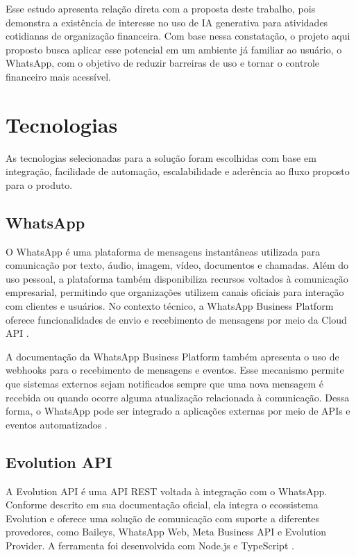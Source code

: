 Esse estudo apresenta relação direta com a proposta deste trabalho, pois demonstra a existência de interesse no uso de IA generativa para atividades cotidianas de organização financeira. Com base nessa constatação, o projeto aqui proposto busca aplicar esse potencial em um ambiente já familiar ao usuário, o WhatsApp, com o objetivo de reduzir barreiras de uso e tornar o controle financeiro mais acessível.

\section{Tecnologias}

As tecnologias selecionadas para a solução foram escolhidas com base em integração, facilidade de automação, escalabilidade e aderência ao fluxo proposto para o produto.

\subsection{WhatsApp}

O WhatsApp é uma plataforma de mensagens instantâneas utilizada para comunicação por texto, áudio, imagem, vídeo, documentos e chamadas. Além do uso pessoal, a plataforma também disponibiliza recursos voltados à comunicação empresarial, permitindo que organizações utilizem canais oficiais para interação com clientes e usuários. No contexto técnico, a WhatsApp Business Platform oferece funcionalidades de envio e recebimento de mensagens por meio da Cloud API \cite{whatsapp_cloud_api_2026}.

A documentação da WhatsApp Business Platform também apresenta o uso de webhooks para o recebimento de mensagens e eventos. Esse mecanismo permite que sistemas externos sejam notificados sempre que uma nova mensagem é recebida ou quando ocorre alguma atualização relacionada à comunicação. Dessa forma, o WhatsApp pode ser integrado a aplicações externas por meio de APIs e eventos automatizados \cite{whatsapp_cloud_api_2026}.

\subsection{Evolution API}

A Evolution API é uma API REST voltada à integração com o WhatsApp. Conforme descrito em sua documentação oficial, ela integra o ecossistema Evolution e oferece uma solução de comunicação com suporte a diferentes provedores, como Baileys, WhatsApp Web, Meta Business API e Evolution Provider. A ferramenta foi desenvolvida com Node.js e TypeScript \cite{evolution_api_docs_2026}.

